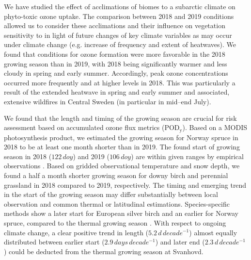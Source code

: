 \documentclass[bg, manuscript]{copernicus}
\begin{document}
\label{sec:conc}

We have studied the effect of acclimations of biomes to a subarctic climate on phyto-toxic ozone uptake. The comparison between 2018 and 2019 conditions allowed us to consider these acclimations and their influence on vegetation sensitivity to  in light of future changes of key climate variables as may occur under climate change (e.g. increase of frequency and extent of heatwaves). We found that conditions for ozone formation were more favorable in the 2018 growing season than in 2019, with 2018 being significantly warmer and less cloudy in spring and early summer. Accordingly, peak ozone concentrations occurred more frequently and at higher levels in 2018. This was particularly a result of the extended heatwave in spring and early summer and associated, extensive wildfires in Central Sweden (in particular in mid--end July).

We found that the length and timing of the growing season are crucial for risk assessment based on accumulated ozone flux metrics ($\mathrm{POD_y}$). Based on a MODIS photosynthesis product, we estimated the growing season for Norway spruce in 2018 to be at least one month shorter than in 2019. The found start of growing season in 2018 ($122\,\unit{doy}$) and 2019 ($106\,\unit{doy}$) are within given ranges by empirical observations \citep{TB:Kolari2007,IVL:Karlsson2018}. Based on gridded observational temperature and snow depth, we found a half a month shorter growing season for downy birch and perennial grassland in 2018 compared to 2019, respectively. The timing and emerging trend in the start of the growing season may differ substantially between local observation and common thermal or latitudinal estimations. Species-specific methods show a later start for European silver birch and an earlier for Norway spruce, compared to the thermal growing season \citep{IVL:Karlsson2018}. With respect to ongoing climate change, a clear positive trend in length ($5.2\,\unit{d\,decade^{-1}}$) almost equally distributed between earlier start ($2.9\,\unit{days\,decade^{-1}}$) and later end ($2.3\,\unit{d\,decade^{-1}}$) could be deducted from the thermal growing season at Svanhovd.
\end{document}
